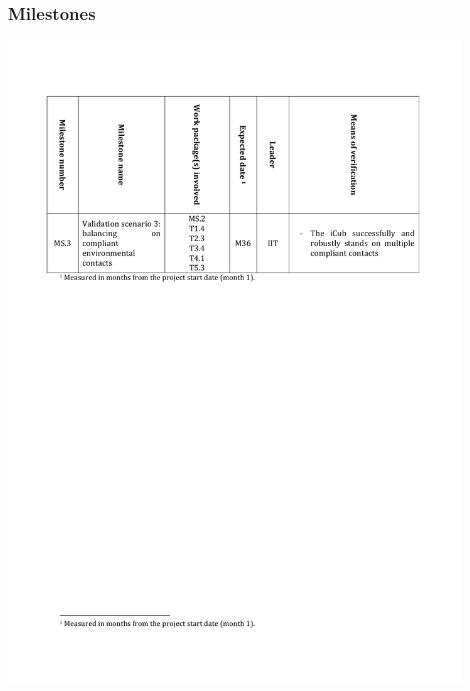 \documentclass[12pt,a4paper,twoside]{article}
\begin{document}
\subsubsection{Milestones}
\centering
\includegraphics[width=0.9\textwidth]{./images/milestones.pdf}

\clearpage

% 



\end{document}
